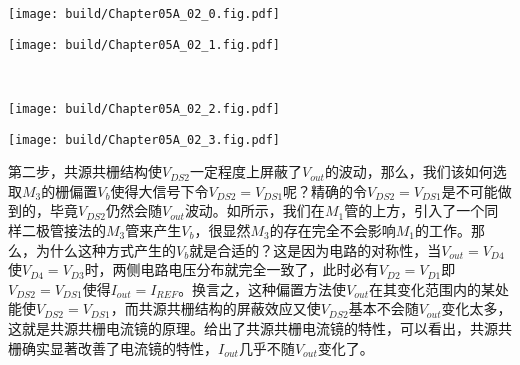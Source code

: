 \begin{Figure}[共源共栅电流镜的特性]
    \begin{FigureSub}
        \texttt{[image: build/Chapter05A\_02\_0.fig.pdf]}
    \end{FigureSub}
    \begin{FigureSub}
        \texttt{[image: build/Chapter05A\_02\_1.fig.pdf]}
    \end{FigureSub}\\ \vspace{0.25cm}
    \hspace*{0.12cm}
    \begin{FigureSub}
        \texttt{[image: build/Chapter05A\_02\_2.fig.pdf]}
    \end{FigureSub}
    \hspace{0.12cm}
    \begin{FigureSub}
        \texttt{[image: build/Chapter05A\_02\_3.fig.pdf]}
    \end{FigureSub}
\end{Figure}

第二步，共源共栅结构使$V_{DS2}$一定程度上屏蔽了$V_{out}$的波动，那么，我们该如何选取$M_3$的栅偏置$V_b$使得大信号下令$V_{DS2}=V_{DS1}$呢？精确的令$V_{DS2}=V_{DS1}$是不可能做到的，毕竟$V_{DS2}$仍然会随$V_{out}$波动。如所示，我们在$M_1$管的上方，引入了一个同样二极管接法的$M_3$管来产生$V_b$，很显然$M_3$的存在完全不会影响$M_1$的工作。那么，为什么这种方式产生的$V_b$就是合适的？这是因为电路的对称性，当$V_{out}=V_{D4}$使$V_{D4}=V_{D3}$时，两侧电路电压分布就完全一致了，此时必有$V_{D2}=V_{D1}$即$V_{DS2}=V_{DS1}$使得$I_{out}=I_{REF}$。换言之，这种偏置方法使$V_{out}$在其变化范围内的某处能使$V_{DS2}=V_{DS1}$，而共源共栅结构的屏蔽效应又使$V_{DS2}$基本不会随$V_{out}$变化太多，这就是共源共栅电流镜的原理。给出了共源共栅电流镜的特性，可以看出，共源共栅确实显著改善了电流镜的特性，$I_{out}$几乎不随$V_{out}$变化了。
